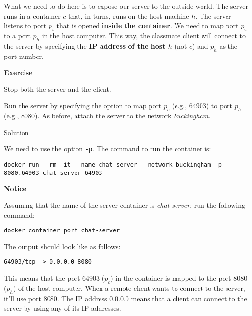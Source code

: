 \documentclass[
]{article}
\newenvironment{infobox}[1]
  {
  \begin{itemize}
  \renewcommand{\labelitemi}{
    \raisebox{-.7\height}[0pt][0pt]{
      
    }
  }
  \setlength{\fboxsep}{1em}
  \begin{whitebox}
  \item
  }
  {
  \end{whitebox}
  \end{itemize}
  }
\theoremstyle{definition}
\theoremstyle{definition}
\theoremstyle{definition}
\theoremstyle{remark}
\let\BeginKnitrBlock\begin \let\EndKnitrBlock\end
\begin{document}
What we need to do here is to expose our server to the outside world.
The server runs in a container \(c\) that, in turns, runs on the host machine \(h\).
The server listens to port \(p_c\) that is opened \textbf{inside the container}.
We need to map port \(p_c\) to a port \(p_h\) in the host computer.
This way, the classmate client will connect to the server by specifying
the \textbf{IP address of the host \(h\)} (not \(c\)) and \(p_h\) as the port number.

\begin{infobox}{exercisebox}

\textbf{Exercise}

\BeginKnitrBlock{exercise}
\protect\hypertarget{exr:unnamed-chunk-43}{}{\label{exr:unnamed-chunk-43} }Stop both the server and the client.

Run the server by specifying the option to map port
\(p_c\) (e.g., 64903) to port \(p_h\) (e.g., 8080).
As before, attach the server to the network \emph{buckingham}.
\EndKnitrBlock{exercise}

\end{infobox}

Solution

\begin{infobox}{exercisebox}

We need to use the option \texttt{-p}. The command to run the container is:

\begin{verbatim}
docker run --rm -it --name chat-server --network buckingham -p 8080:64903 chat-server 64903
\end{verbatim}

\end{infobox}

\begin{infobox}{warning}

\textbf{Notice}

Assuming that the name of the server container is
\emph{chat-server}, run the following command:

\begin{verbatim}
docker container port chat-server
\end{verbatim}

The output should look like as follows:

\begin{verbatim}
64903/tcp -> 0.0.0.0:8080
\end{verbatim}

This means that the port 64903 (\(p_c\)) in the container is mapped to the port
8080 (\(p_h\)) of the host computer.
When a remote client wants to connect to the server, it'll use port 8080.
The IP address 0.0.0.0 means that a client can connect to the server
by using any of its IP addresses.

\end{infobox}
\end{document}
